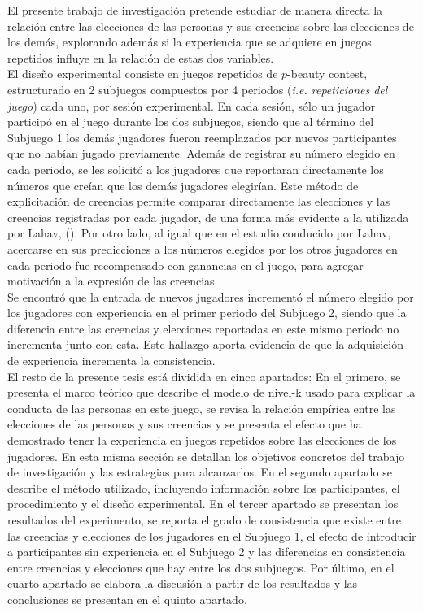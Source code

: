 El presente trabajo de investigación pretende estudiar de manera directa la relación entre las elecciones de las personas y sus creencias sobre las elecciones de los demás, explorando además si la experiencia que se adquiere en juegos repetidos influye en la relación de estas dos variables.\\

El diseño experimental consiste en juegos repetidos de $p$-beauty contest, estructurado en 2 subjuegos compuestos por 4 periodos (\textit{i.e. repeticiones del juego}) cada uno, por sesión experimental. En cada sesión, sólo un jugador participó en el juego durante los dos subjuegos, siendo que al término del Subjuego 1 los demás jugadores fueron reemplazados por nuevos participantes que no habían jugado previamente. Además de registrar su número elegido en cada periodo, se les solicitó a los jugadores que reportaran directamente los números que creían que los demás jugadores elegirían. Este método de explicitación de creencias permite comparar directamente las elecciones y las creencias registradas por cada jugador, de una forma más evidente a la utilizada por Lahav, (\citeyear{Lahav}). Por otro lado, al igual que en el estudio conducido por Lahav, acercarse en sus predicciones a los números elegidos por los otros jugadores en cada periodo fue recompensado con ganancias en el juego, para agregar motivación a la expresión de las creencias.\\

Se encontró que la entrada de nuevos jugadores incrementó el número elegido por los jugadores con experiencia en el primer periodo del Subjuego 2, siendo que la diferencia entre las creencias y elecciones reportadas en este mismo periodo no incrementa junto con esta. Este hallazgo aporta evidencia de que la adquisición de experiencia incrementa la consistencia.\\

El resto de la presente tesis está dividida en cinco apartados: En el primero, se presenta el marco teórico que describe el modelo de nivel-k usado para explicar la conducta de las personas en este juego, se revisa la relación empírica entre las elecciones de las personas y sus creencias y se presenta el efecto que ha demostrado tener la experiencia en juegos repetidos sobre las elecciones de los jugadores. En esta misma sección se detallan los objetivos concretos del trabajo de investigación y las estrategias para alcanzarlos. En el segundo apartado se describe el método utilizado, incluyendo información sobre los participantes, el procedimiento y el diseño experimental. En el tercer apartado se presentan los resultados del experimento, se reporta el grado de consistencia que existe entre las creencias y elecciones de los jugadores en el Subjuego 1, el efecto de introducir a participantes sin experiencia en el Subjuego 2 y las diferencias en consistencia entre creencias y elecciones que hay entre los dos subjuegos. Por último, en el cuarto apartado se elabora la discusión a partir de los resultados y las conclusiones se presentan en el quinto apartado.\\
